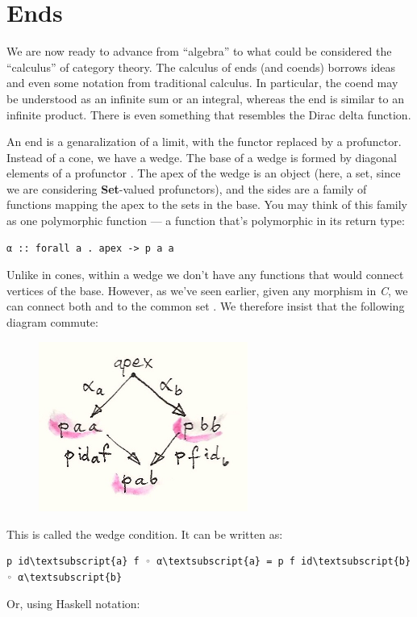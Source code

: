 \section{Ends}\label{ends}

We are now ready to advance from ``algebra'' to what could be considered
the ``calculus'' of category theory. The calculus of ends (and coends)
borrows ideas and even some notation from traditional calculus. In
particular, the coend may be understood as an infinite sum or an
integral, whereas the end is similar to an infinite product. There is
even something that resembles the Dirac delta function.

An end is a genaralization of a limit, with the functor replaced by a
profunctor. Instead of a cone, we have a wedge. The base of a wedge is
formed by diagonal elements of a profunctor . The apex of the
wedge is an object (here, a set, since we are considering
\textbf{Set}-valued profunctors), and the sides are a family of
functions mapping the apex to the sets in the base. You may think of
this family as one polymorphic function --- a function that's
polymorphic in its return type:

\begin{verbatim}
α :: forall a . apex -> p a a
\end{verbatim}
Unlike in cones, within a wedge we don't have any functions that would
connect vertices of the base. However, as we've seen earlier, given any
morphism  in \emph{C}, we can connect both
 and  to the common set
. We therefore insist that the following diagram
commute:

\begin{figure}[H]
\centering
\includegraphics[width=2.69792in]{images/end-2.jpg}
\end{figure}

\noindent
This is called the wedge condition. It can be written as:

\begin{Verbatim}[commandchars=\\\{\}]
p id\textsubscript{a} f ◦ α\textsubscript{a} = p f id\textsubscript{b} ◦ α\textsubscript{b}
\end{Verbatim}
Or, using Haskell notation:

